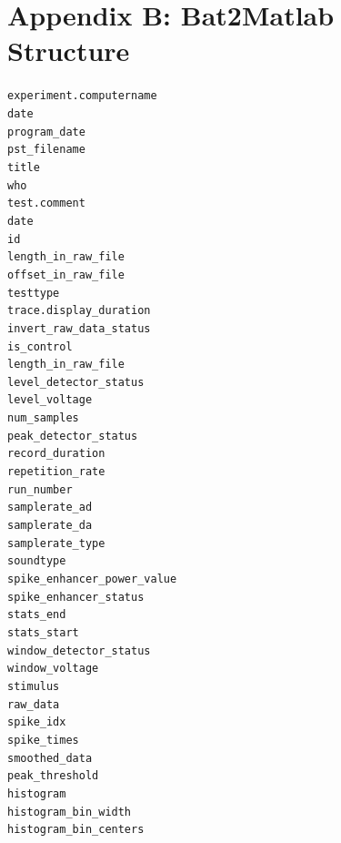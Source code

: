 \documentclass[11pt,letterpaper]{article}
\begin{document}
\section{Appendix B: Bat2Matlab Structure}
\begin{footnotesize}
\begin{alltt}
experiment.computername
           date
           program_date
           pst_filename
           title
           who
           test.comment
                date
                id
                length_in_raw_file
                offset_in_raw_file
                testtype
                trace.display_duration
                      invert_raw_data_status
                      is_control
                      length_in_raw_file
                      level_detector_status
                      level_voltage
                      num_samples
                      peak_detector_status
                      record_duration
                      repetition_rate
                      run_number
                      samplerate_ad
                      samplerate_da
                      samplerate_type
                      soundtype
                      spike_enhancer_power_value
                      spike_enhancer_status
                      stats_end
                      stats_start
                      window_detector_status
                      window_voltage
                      stimulus
                      raw_data
                      spike_idx
                      spike_times
                      smoothed_data
                      peak_threshold
                      histogram
                      histogram_bin_width
                      histogram_bin_centers
\end{alltt}
\end{footnotesize}
\end{document}
